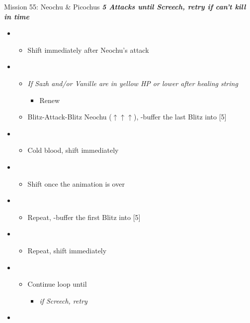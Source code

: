 \begin{battle}{Mission 55: Neochu \& Picochus}
	\textit{\textbf{5 Attacks until Screech, retry if can't kill in time}}
	\begin{itemize}
		\item \fourth
			\begin{itemize}
				\item Shift immediately after Neochu's attack
			\end{itemize}
		\item \first
			\begin{itemize}
				\item \textit{If Sazh and/or Vanille are in yellow HP or lower after healing string}
					\begin{itemize}
						\item Renew
					\end{itemize}
				\item Blitz-Attack-Blitz Neochu ($\uparrow\uparrow\uparrow$), \rav-buffer the last Blitz into [5]
			\end{itemize}
		\item \fifth
			\begin{itemize}
				\item Cold blood, shift immediately
			\end{itemize}		
		\item \third
			\begin{itemize}
				\item Shift once the animation is over
			\end{itemize}		
		\item \first
			\begin{itemize}
				\item Repeat, \rav-buffer the first Blitz into [5]
			\end{itemize}		
		\item \fifth
			\begin{itemize}
				\item Repeat, shift immediately
			\end{itemize}		
		\item \third
			\begin{itemize}
				\item Continue loop until \stagger
					\begin{itemize}
						\item \textit{if Screech, retry}
					\end{itemize}
			\end{itemize}		
		\item \second

\end{itemize}
\end{battle}
